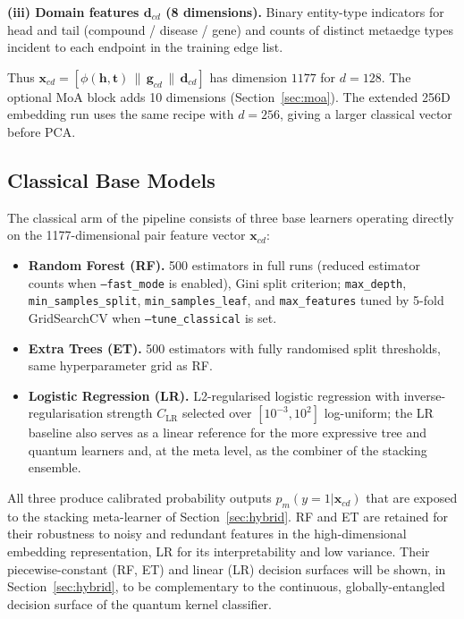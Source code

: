\documentclass[twocolumn,10pt]{article}
\begin{document}
\textbf{(iii) Domain features $\mathbf{d}_{cd}$ (8 dimensions).} Binary entity-type indicators for head and tail (compound / disease / gene) and counts of distinct metaedge types incident to each endpoint in the training edge list.

Thus $\mathbf{x}_{cd} = [\phi(\mathbf{h},\mathbf{t})\,\|\,\mathbf{g}_{cd}\,\|\,\mathbf{d}_{cd}]$ has dimension $1177$ for $d{=}128$. The optional MoA block adds 10 dimensions (Section~\ref{sec:moa}). The extended 256D embedding run uses the same recipe with $d{=}256$, giving a larger classical vector before PCA.

\subsection{Classical Base Models}
\label{sec:classical}

The classical arm of the pipeline consists of three base learners operating directly on the 1177-dimensional pair feature vector $\mathbf{x}_{cd}$:

\begin{itemize}[leftmargin=*]
\item \textbf{Random Forest (RF).} 500 estimators in full runs (reduced estimator counts when \texttt{--fast\_mode} is enabled), Gini split criterion; \texttt{max\_depth}, \texttt{min\_samples\_split}, \texttt{min\_samples\_leaf}, and \texttt{max\_features} tuned by 5-fold GridSearchCV when \texttt{--tune\_classical} is set.
\item \textbf{Extra Trees (ET).} 500 estimators with fully randomised split thresholds, same hyperparameter grid as RF.
\item \textbf{Logistic Regression (LR).} L2-regularised logistic regression with inverse-regularisation strength $C_{\mathrm{LR}}$ selected over $[10^{-3}, 10^{2}]$ log-uniform; the LR baseline also serves as a linear reference for the more expressive tree and quantum learners and, at the meta level, as the combiner of the stacking ensemble.
\end{itemize}

All three produce calibrated probability outputs $p_{m}(y=1|\mathbf{x}_{cd})$ that are exposed to the stacking meta-learner of Section~\ref{sec:hybrid}. RF and ET are retained for their robustness to noisy and redundant features in the high-dimensional embedding representation, LR for its interpretability and low variance. Their piecewise-constant (RF, ET) and linear (LR) decision surfaces will be shown, in Section~\ref{sec:hybrid}, to be complementary to the continuous, globally-entangled decision surface of the quantum kernel classifier.
\end{document}

